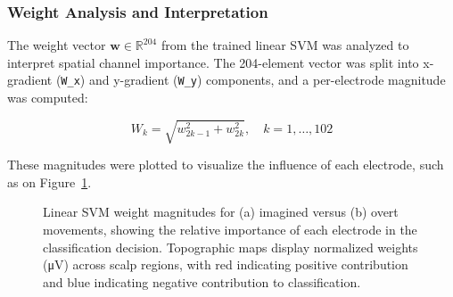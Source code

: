 \documentclass[
  letterpaper,
  DIV=11,
  numbers=noendperiod]{scrartcl}
\begin{document}
\subsubsection{Weight Analysis and
Interpretation}\label{weight-analysis-and-interpretation}

The weight vector \(\mathbf{w} \in \mathbb{R}^{204}\) from the trained
linear SVM was analyzed to interpret spatial channel importance. The
204-element vector was split into x-gradient (\texttt{W\_x}) and
y-gradient (\texttt{W\_y}) components, and a per-electrode magnitude was
computed:

\[
W_k = \sqrt{w_{2k-1}^2 + w_{2k}^2}, \quad k = 1, \dots, 102
\]

These magnitudes were plotted to visualize the influence of each
electrode, such as on Figure~\ref{fig-linearSVM-weights}.

\begin{figure}


\caption{\label{fig-linearSVM-weights}Linear SVM weight magnitudes for
(a) imagined versus (b) overt movements, showing the relative importance
of each electrode in the classification decision. Topographic maps
display normalized weights (μV) across scalp regions, with red
indicating positive contribution and blue indicating negative
contribution to classification.}

\end{figure}%
\end{document}
